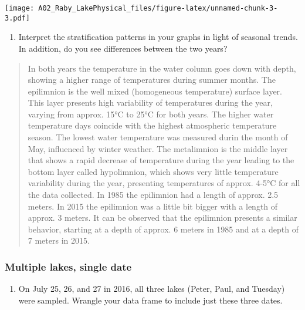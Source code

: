 \documentclass[]{article}
\providecommand{\tightlist}{%
  \setlength{\itemsep}{0pt}\setlength{\parskip}{0pt}}
\begin{document}
\texttt{[image: A02\_Raby\_LakePhysical\_files/figure-latex/unnamed-chunk-3-3.pdf]}

\begin{enumerate}
\def\labelenumi{\arabic{enumi}.}
\setcounter{enumi}{6}
\tightlist
\item
  Interpret the stratification patterns in your graphs in light of
  seasonal trends. In addition, do you see differences between the two
  years?
\end{enumerate}

\begin{quote}
In both years the temperature in the water column goes down with depth,
showing a higher range of temperatures during summer months. The
epilimnion is the well mixed (homogeneous temperature) surface layer.
This layer presents high variability of temperatures during the year,
varying from approx. 15°C to 25°C for both years. The higher water
temperature days coincide with the highest atmospheric temperature
season. The lowest water temperature was measured durin the month of
May, influenced by winter weather. The metalimnion is the middle layer
that shows a rapid decrease of temperature during the year leading to
the bottom layer called hypolimnion, which shows very little temperature
variability during the year, presenting temperatures of approx. 4-5°C
for all the data collected. In 1985 the epilimnion had a length of
approx. 2.5 meters. In 2015 the epilimnion was a little bit bigger with
a length of approx. 3 meters. It can be observed that the epilimnion
presents a similar behavior, starting at a depth of approx. 6 meters in
1985 and at a depth of 7 meters in 2015.
\end{quote}

\hypertarget{multiple-lakes-single-date}{%
\subsubsection{Multiple lakes, single
date}\label{multiple-lakes-single-date}}

\begin{enumerate}
\def\labelenumi{\arabic{enumi}.}
\setcounter{enumi}{7}
\tightlist
\item
  On July 25, 26, and 27 in 2016, all three lakes (Peter, Paul, and
  Tuesday) were sampled. Wrangle your data frame to include just these
  three dates.
\end{enumerate}
\end{document}
